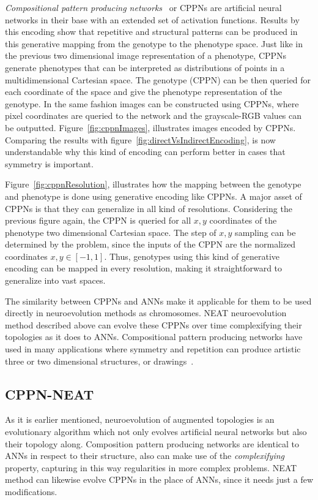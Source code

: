 \emph{Compositional pattern producing networks}~\cite{stanley2007compositional} or CPPNs are artificial neural networks in their base with an extended set of activation functions. Results by this encoding show that repetitive and structural patterns can be produced in this generative mapping from the genotype to the phenotype space. Just like in the previous two dimensional image representation of a phenotype, CPPNs generate phenotypes that can be interpreted as distributions of points in a multidimensional Cartesian space. The genotype (CPPN) can be then queried for each coordinate of the space and give the phenotype representation of the genotype. In the same fashion images can be constructed using CPPNs, where pixel coordinates are queried to the network and the grayscale-RGB values can be outputted. Figure~\ref{fig:cppnImages}, illustrates images encoded by CPPNs. Comparing the results with figure~\ref{fig:directVsIndirectEncoding}, is now understandable why this kind of encoding can perform better in cases that symmetry is important.

Figure~\ref{fig:cppnResolution}, illustrates how the mapping between the genotype and phenotype is done using generative encoding like CPPNs. A major asset of CPPNs is that they can generalize in all kind of resolutions. Considering the previous figure again, the CPPN is queried for all $x,y$ coordinates of the phenotype two dimensional Cartesian space. The step of $x,y$ sampling can be determined by the problem, since the inputs of the CPPN are the normalized coordinates $x,y \in [-1,1]$. Thus, genotypes using this kind of generative encoding can be mapped in every resolution, making it straightforward to generalize into vast spaces.

The similarity between CPPNs and ANNs make it applicable for them to be used directly in neuroevolution methods as chromosomes. NEAT neuroevolution method described above can evolve these CPPNs over time complexifying their topologies as it does to ANNs. Compositional pattern producing networks have used in many applications where symmetry and repetition can produce artistic three or two dimensional structures\cite{endlessforms}, or drawings~\cite{secretan2008picbreeder,picbreederSite}.



\subsection*{CPPN-NEAT}

As it is earlier mentioned, neuroevolution of augmented topologies is an evolutionary algorithm which not only evolves artificial neural networks but also their topology along. Composition pattern producing networks are identical to ANNs in respect to their structure, also can make use of the \emph{complexifying} property, capturing in this way regularities in more complex problems. NEAT method can likewise evolve CPPNs in the place of ANNs, since it needs just a few modifications.

